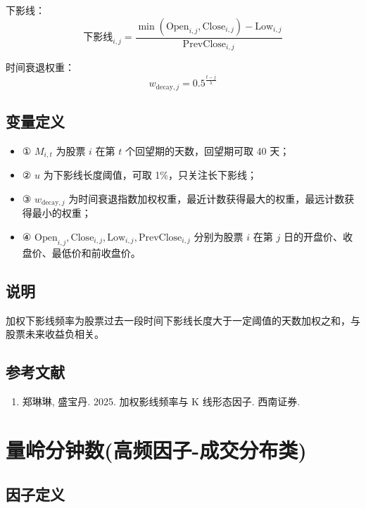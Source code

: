 \documentclass{article}
\begin{document}
下影线：
\begin{equation}
    \text{下影线}_{i,j} = \frac{\min(\mathrm{Open}_{i,j}, \mathrm{Close}_{i,j}) - \mathrm{Low}_{i,j}}{\mathrm{PrevClose}_{i,j}}
\end{equation}

时间衰退权重：
\begin{equation}
    w_{\mathrm{decay},j} = 0.5^{\frac{t-j}{\lambda}}
\end{equation}

\subsection{变量定义}
\begin{itemize}
    \item ① \( M_{i,t} \) 为股票 \( i \) 在第 \( t \) 个回望期的天数，回望期可取 40 天；
    \item ② \( u \) 为下影线长度阈值，可取 1\%，只关注长下影线；
    \item ③ \( w_{\mathrm{decay},j} \) 为时间衰退指数加权权重，最近计数获得最大的权重，最远计数获得最小的权重；
    \item ④ \( \mathrm{Open}_{i,j}, \mathrm{Close}_{i,j}, \mathrm{Low}_{i,j}, \mathrm{PrevClose}_{i,j} \) 分别为股票 \( i \) 在第 \( j \) 日的开盘价、收盘价、最低价和前收盘价。
\end{itemize}

\subsection{说明}
加权下影线频率为股票过去一段时间下影线长度大于一定阈值的天数加权之和，与股票未来收益负相关。

\subsection{参考文献}
\begin{enumerate}
    \item 郑琳琳, 盛宝丹. 2025. 加权影线频率与 K 线形态因子. 西南证券.
\end{enumerate}

\section{量岭分钟数(高频因子-成交分布类)}

\subsection{因子定义}
\end{document}
